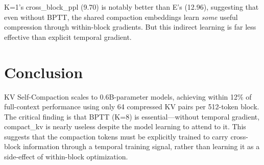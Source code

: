 \documentclass[11pt]{article}
\begin{document}
K=1's cross\_block\_ppl (9.70) is notably better than E's (12.96), suggesting that
even without BPTT, the shared compaction embeddings learn \emph{some} useful compression
through within-block gradients. But this indirect learning is far less effective than
explicit temporal gradient.

\section{Conclusion}

KV Self-Compaction scales to 0.6B-parameter models, achieving within 12\% of
full-context performance using only 64 compressed KV pairs per 512-token block.
The critical finding is that BPTT (K=8) is essential---without temporal gradient,
compact\_kv is nearly useless despite the model learning to attend to it. This
suggests that the compaction tokens must be explicitly trained to carry cross-block
information through a temporal training signal, rather than learning it as a
side-effect of within-block optimization.
\end{document}
